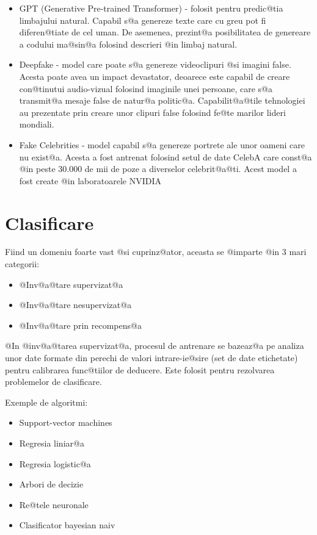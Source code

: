 \begin{itemize}
	\item GPT (Generative Pre-trained Transformer) - folosit pentru predic@tia limbajului na\-tu\-ral. Capabil s@a genereze texte care cu greu pot fi diferen@tiate de cel uman. De asemenea, prezint@a posibilitatea de genereare a codului ma@sin@a folosind descrieri @in limbaj natural.
	\item Deepfake - model care poate s@a genereze videoclipuri @si imagini false. Acesta poate avea un impact devastator, deoarece este capabil de creare con@tinutui audio-vizual folosind imaginile unei persoane, care s@a transmit@a mesaje false de natur@a politic@a. Capabilit@a@tile tehnologiei au prezentate prin creare unor clipuri false folosind fe@te marilor lideri mondiali.
	\item Fake Celebrities - model capabil s@a genereze portrete ale unor oameni care nu exist@a. Acesta a fost antrenat folosind setul de date CelebA care const@a @in peste 30.000 de mii de poze a diverselor celebrit@a@ti. Acest model a fost create @in laboratoarele NVIDIA 
	\cite{nvidia-gan}  
\end{itemize}
 
\newpage

\section{Clasificare}

Fiind un domeniu foarte vast @si cuprinz@ator, aceasta se @imparte @in 3 mari categorii:
\hspace{0.2cm}\begin{itemize}
	\item @Inv@a@tare supervizat@a
	\item @Inv@a@tare nesupervizat@a
	\item @Inv@a@tare prin recompens@a
\end{itemize}

\vspace{0.3cm}
@In @inv@a@tarea supervizat@a, procesul de antrenare se bazeaz@a pe analiza unor date formate din perechi de valori intrare-ie@sire (set de date etichetate) pentru calibrarea func@tiilor de deducere. Este folosit pentru rezolvarea problemelor de clasificare.

Exemple de algoritmi:
\begin{itemize}
	\item Support-vector machines
	\item Regresia liniar@a
	\item Regresia logistic@a
	\item Arbori de decizie
	\item Re@tele neuronale
	\item Clasificator bayesian naiv
\end{itemize}


